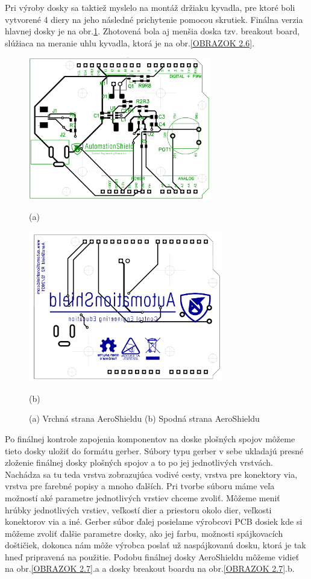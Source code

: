 Pri výroby dosky sa taktiež myslelo na montáž držiaku kyvadla, pre ktoré boli vytvorené 4 diery na jeho následné prichytenie pomocou skrutiek. Finálna verzia hlavnej dosky je na obr.\ref{OBRAZOK 2.4}. Zhotovená bola aj menšia doska tzv. breakout board, slúžiaca na meranie uhlu kyvadla, ktorá je na obr.\ref{OBRAZOK 2.6}.



\begin{figure}
	\centering
	\includegraphics[width=8cm]{obr/AeroShieldTOP.png}
	
	(a)
	
	\includegraphics[width=8.5cm]{obr/AeroShieldBOTTOM.png}
	
	(b)
	
	\caption{(a) Vrchná strana AeroShieldu (b) Spodná strana AeroShieldu}
	\label{OBRAZOK 2.4}
\end{figure}



Po finálnej kontrole zapojenia komponentov na doske plošných spojov môžeme tieto dosky uložiť do formátu gerber. Súbory typu gerber v sebe ukladajú presné zloženie finálnej dosky plošných spojov a to po jej jednotlivých vrstvách. Nachádza sa tu teda vrstva zobrazujúca vodivé cesty, vrstva pre konektory via, vrstva pre farebné popisy a mnoho ďalších. Pri tvorbe súboru máme veľa možností aké parametre jednotlivých vrstiev chceme zvoliť. Môžeme meniť hrúbky jednotlivých vrstiev, veľkostí dier a priestoru okolo dier, veľkosti konektorov via a iné. Gerber súbor ďalej posielame výrobcovi PCB dosiek kde si môžeme zvoliť ďalšie parametre dosky, ako jej farbu, možnosti spájkovacích doštičiek, dokonca nám môže výrobca poslať už naspájkovanú dosku, ktorá je tak hneď pripravená na použitie. Podobu finálnej dosky AeroShieldu môžeme vidieť na obr.\ref{OBRAZOK 2.7}.a a dosky breakout boardu na obr.\ref{OBRAZOK 2.7}.b.


